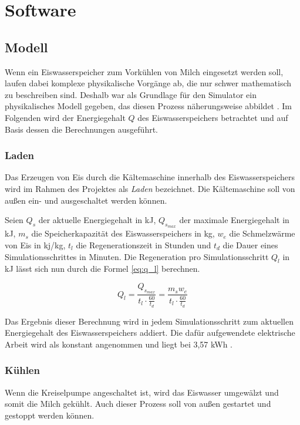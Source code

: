 \chapter{Software}

\section{Modell}
\label{software_model}

Wenn ein Eiswasserspeicher zum Vorkühlen von Milch eingesetzt werden soll, laufen dabei komplexe physikalische Vorgänge ab, die nur schwer mathematisch zu beschreiben sind. Deshalb war als Grundlage für den Simulator ein physikalisches Modell gegeben, das diesen Prozess näherungsweise abbildet \cite{kusow}.
Im Folgenden wird der Energiegehalt $ Q $ des Eiswasserspeichers betrachtet und auf Basis dessen die Berechnungen ausgeführt. %

\subsection{Laden}
Das Erzeugen von Eis durch die Kältemaschine innerhalb des Eiswasserspeichers wird im Rahmen des Projektes als \emph{Laden} bezeichnet. Die Kältemaschine soll von außen ein- und ausgeschaltet werden können.

Seien $ Q_s $ der aktuelle Energiegehalt in kJ, $ Q_{s_{max}} $ der maximale Energiegehalt in kJ, $ m_s $ die Speicherkapazität des Eiswasserspeichers in kg, $ w_e $ die Schmelzwärme von Eis in kj/kg, $ t_l $ die Regenerationszeit in Stunden und $ t_d $ die Dauer eines Simulationsschrittes in Minuten. Die Regeneration pro Simulationsschritt $ Q_l $ in kJ lässt sich nun durch die Formel \ref{eq:q_l} berechnen.

\begin{equation}\label{eq:q_l}
Q_l = \frac{Q_{s_{max}}}{t_l \cdot \frac{60}{t_d}} = \frac{m_s w_e}{t_l \cdot \frac{60}{t_d}}
\end{equation}

Das Ergebnis dieser Berechnung wird in jedem Simulationsschritt zum aktuellen Energiegehalt des Eiswasserspeichers addiert. Die dafür aufgewendete elektrische Arbeit wird als konstant angenommen und liegt bei 3,57 kWh \cite{kusow}.

\subsection{Kühlen}
Wenn die Kreiselpumpe angeschaltet ist, wird das Eiswasser umgewälzt und somit die Milch gekühlt. Auch dieser Prozess soll von außen gestartet und gestoppt werden können.

